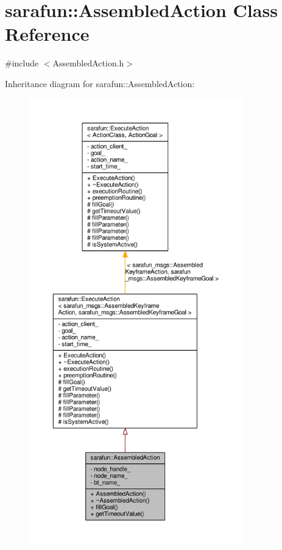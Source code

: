 \hypertarget{classsarafun_1_1AssembledAction}{\section{sarafun\-:\-:Assembled\-Action Class Reference}
\label{classsarafun_1_1AssembledAction}
}


{\ttfamily \#include $<$Assembled\-Action.\-h$>$}



Inheritance diagram for sarafun\-:\-:Assembled\-Action\-:
\nopagebreak
\begin{figure}[H]
\begin{center}
\leavevmode
\includegraphics[height=550pt]{d9/d73/classsarafun_1_1AssembledAction__inherit__graph}
\end{center}
\end{figure}


